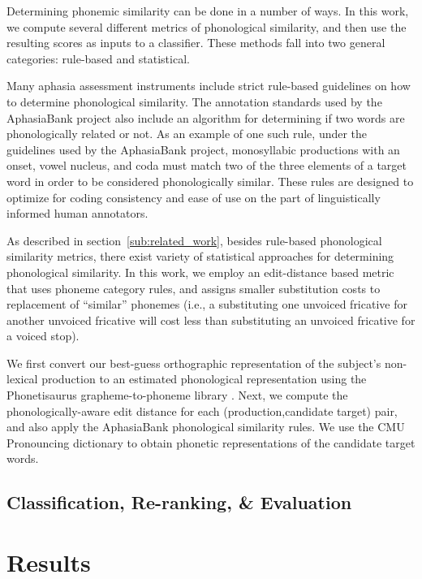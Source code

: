 \documentclass[11pt,letterpaper]{article}
\begin{document}
Determining phonemic similarity can be done in a number of ways. 
In this work, we compute several different metrics of phonological similarity, and then use the resulting scores as inputs to a classifier. 
These methods fall into two general categories: rule-based and statistical.

Many aphasia assessment instruments include strict rule-based guidelines on how to determine phonological similarity.
The annotation standards used by the AphasiaBank project also include an algorithm for determining if two words are phonologically related or not.
As an example of one such rule, under the guidelines used by the AphasiaBank project, monosyllabic productions with an onset, vowel nucleus, and coda must match two of the three elements of a target word in order to be considered phonologically similar.
These rules are designed to optimize for coding consistency and ease of use on the part of linguistically informed human annotators.

As described in section~\ref{sub:related_work}, besides rule-based phonological similarity metrics, there exist variety of statistical approaches for determining phonological similarity. 
In this work, we employ an edit-distance based metric that uses phoneme category rules, and assigns smaller substitution costs to replacement of ``similar'' phonemes (i.e., a substituting one unvoiced fricative for another unvoiced fricative will cost less than substituting an unvoiced fricative for a voiced stop).

We first convert our best-guess orthographic representation of the subject's non-lexical production to an estimated phonological representation using the Phonetisaurus grapheme-to-phoneme library \cite{Novak:2011aa}. 
Next, we compute the phonologically-aware edit distance for each (production,candidate target) pair, and also apply the AphasiaBank phonological similarity rules. We use the CMU Pronouncing dictionary to obtain phonetic representations of the candidate target words.


\subsection{Classification, Re-ranking, \& Evaluation} %
\label{sub:ranking_scoring}


\section{Results} %
\label{sec:results}
\end{document}
